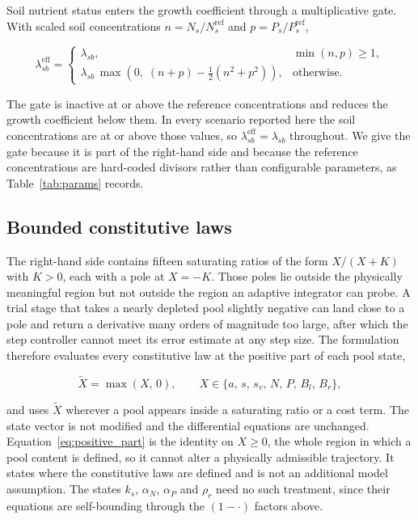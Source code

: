 Soil nutrient status enters the growth coefficient through a multiplicative
gate. With scaled soil concentrations $n = N_s/N_s^{\mathrm{ref}}$ and
$p = P_s/P_s^{\mathrm{ref}}$,

\begin{equation}
\lambda_{sb}^{\mathrm{eff}} =
\begin{cases}
\lambda_{sb}, & \min(n,p) \geq 1, \\[4pt]
\lambda_{sb}\,\max\!\left(0,\; \left(n+p\right) - \tfrac{1}{2}\left(n^{2}+p^{2}\right)\right),
& \text{otherwise} .
\end{cases}
\label{eq:lambda_gate}
\end{equation}

The gate is inactive at or above the reference concentrations and reduces the
growth coefficient below them. In every scenario reported here the soil
concentrations are at or above those values, so
$\lambda_{sb}^{\mathrm{eff}} = \lambda_{sb}$ throughout. We give the gate because
it is part of the right-hand side and because the reference concentrations are
hard-coded divisors rather than configurable parameters, as
Table~\ref{tab:params} records.

\subsection{Bounded constitutive laws}
\label{sec:bounded}

The right-hand side contains fifteen saturating ratios of the form $X/(X+K)$ with
$K>0$, each with a pole at $X = -K$. Those poles lie outside the physically
meaningful region but not outside the region an adaptive integrator can probe. A
trial stage that takes a nearly depleted pool slightly negative can land close to a
pole and return a derivative many orders of magnitude too large, after which the
step controller cannot meet its error estimate at any step size. The formulation
therefore evaluates every constitutive law at the positive part of each pool state,

\begin{equation}
\widetilde{X} = \max(X,\,0),
\qquad X \in \{a,\,s,\,s_v,\,N,\,P,\,B_l,\,B_r\},
\label{eq:positive_part}
\end{equation}

and uses $\widetilde{X}$ wherever a pool appears inside a saturating ratio or a
cost term. The state vector is not modified and the differential equations are
unchanged. Equation~\eqref{eq:positive_part} is the identity on $X \geq 0$, the
whole region in which a pool content is defined, so it cannot alter a physically
admissible trajectory. It states where the constitutive laws are defined and is
not an additional model assumption. The states $k_s$, $\alpha_N$, $\alpha_P$ and
$\rho_r$ need no such treatment, since their equations are self-bounding through
the $(1-\cdot)$ factors above.

